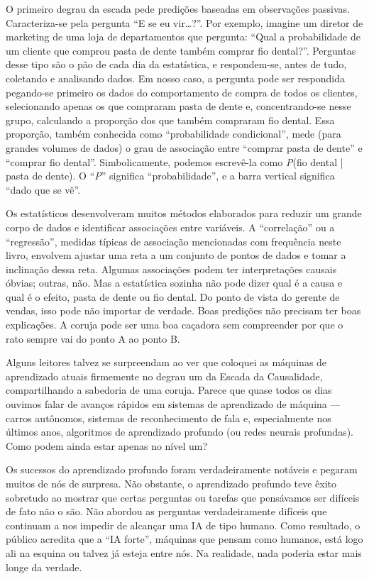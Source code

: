 \documentclass[11pt,a5paper,twoside]{book}
\begin{document}
O primeiro degrau da escada pede predições baseadas em observações passivas. Caracteriza-se pela pergunta “E se eu vir…?”. Por exemplo, imagine um diretor de marketing de uma loja de departamentos que pergunta: “Qual a probabilidade de um cliente que comprou pasta de dente também comprar fio dental?”. Perguntas desse tipo são o pão de cada dia da estatística, e respondem-se, antes de tudo, coletando e analisando dados. Em nosso caso, a pergunta pode ser respondida pegando-se primeiro os dados do comportamento de compra de todos os clientes, selecionando apenas os que compraram pasta de dente e, concentrando-se nesse grupo, calculando a proporção dos que também compraram fio dental. Essa proporção, também conhecida como “probabilidade condicional”, mede (para grandes volumes de dados) o grau de associação entre “comprar pasta de dente” e “comprar fio dental”. Simbolicamente, podemos escrevê-la como \textit{P}(fio dental | pasta de dente). O “\textit{P}” significa “probabilidade”, e a barra vertical significa “dado que se vê”.

Os estatísticos desenvolveram muitos métodos elaborados para reduzir um grande corpo de dados e identificar associações entre variáveis. A “correlação” ou a “regressão”, medidas típicas de associação mencionadas com frequência neste livro, envolvem ajustar uma reta a um conjunto de pontos de dados e tomar a inclinação dessa reta. Algumas associações podem ter interpretações causais óbvias; outras, não. Mas a estatística sozinha não pode dizer qual é a causa e qual é o efeito, pasta de dente ou fio dental. Do ponto de vista do gerente de vendas, isso pode não importar de verdade. Boas predições não precisam ter boas explicações. A coruja pode ser uma boa caçadora sem compreender por que o rato sempre vai do ponto A ao ponto B.

Alguns leitores talvez se surpreendam ao ver que coloquei as máquinas de aprendizado atuais firmemente no degrau um da Escada da Causalidade, compartilhando a sabedoria de uma coruja. Parece que quase todos os dias ouvimos falar de avanços rápidos em sistemas de aprendizado de máquina — carros autônomos, sistemas de reconhecimento de fala e, especialmente nos últimos anos, algoritmos de aprendizado profundo (ou redes neurais profundas). Como podem ainda estar apenas no nível um?

Os sucessos do aprendizado profundo foram verdadeiramente notáveis e pegaram muitos de nós de surpresa. Não obstante, o aprendizado profundo teve êxito sobretudo ao mostrar que certas perguntas ou tarefas que pensávamos ser difíceis de fato não o são. Não abordou as perguntas verdadeiramente difíceis que continuam a nos impedir de alcançar uma IA de tipo humano. Como resultado, o público acredita que a “IA forte”, máquinas que pensam como humanos, está logo ali na esquina ou talvez já esteja entre nós. Na realidade, nada poderia estar mais longe da verdade.
\end{document}
